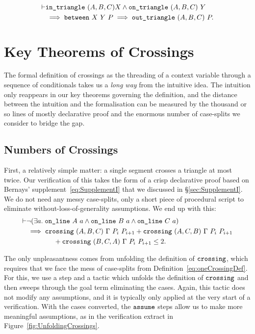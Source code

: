 \begin{equation}\label{eq:outTriangle2}
  \begin{split}
    \vdash&\texttt{in\_triangle}\ (A,B,C) X \wedge \texttt{on\_triangle}\ (A,B,C)\ Y\\
    &\implies \texttt{between}\ X\ Y\ P \implies \texttt{out\_triangle}\ (A,B,C)\ P.
  \end{split}
\end{equation}

\section{Key Theorems of Crossings}\label{sec:CrossingVerification}
The formal definition of crossings as the threading of a context variable through a sequence of conditionals takes us a \emph{long way} from the intuitive idea. The intuition only reappears in our key theorems governing the definition, and the distance between the intuition and the formalisation can be measured by the thousand or so lines of mostly declarative proof and the enormous number of case-splits we consider to bridge the gap.

\subsection{Numbers of Crossings}
First, a relatively simple matter: a single segment crosses a triangle at most twice. Our verification of this takes the form of a crisp declarative proof based on Bernays' supplement~\eqref{eq:SupplementI} that we discussed in \S\ref{sec:SupplementI}. We do not need any messy case-splits, only a short piece of procedural script to eliminate without-loss-of-generality assumptions. We end up with this:
\begin{equation*}
  \begin{split}
    \vdash&\neg(\exists a.\; \texttt{on\_line}\ A\ a\wedge \texttt{on\_line}\ B\ a\wedge \texttt{on\_line}\ C\ a)\\
    &\implies \texttt{crossing}\ (A,B,C)\ \Gamma\ P_i\ P_{i+1} + \texttt{crossing}\ (A,C,B)\ \Gamma\ P_i\ P_{i+1}\\
    &\qquad\qquad+ \texttt{crossing}\ (B,C,A)\ \Gamma\ P_i\ P_{i+1} \leq 2.
  \end{split}
\end{equation*}

The only unpleasantness comes from unfolding the definition of $\texttt{crossing}$, which requires that we face the mess of case-splits from Definition~\ref{eq:oneCrossingDef}. For this, we use a  step and a tactic  which unfolds the definition of $\texttt{crossing}$ and then sweeps through the goal term eliminating the cases. Again, this tactic does not modify any assumptions, and it is typically only applied at the very start of a verification. With the cases converted, the $\texttt{assume}$ steps allow us to make more meaningful assumptions, as in the verification extract in Figure~\ref{fig:UnfoldingCrossings}.

